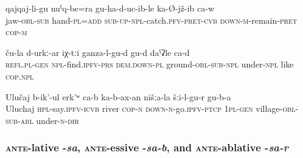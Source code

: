 \begin{exe}	
	\ex	\label{He is sitting with his hands holding his head}
	\gll	qajqaj-li-gu	nuˁq-be=ra	gu-ha-d-uc-ib-le	ka-Ø-jž-ib ca-w\\
		jaw-\textsc{obl}-\textsc{sub}	hand-\textsc{pl}=\textsc{add}	\textsc{sub-up-npl}-catch.\textsc{pfv}-\textsc{pret}-\textsc{cvb}	\textsc{down-m}-remain-\textsc{pret} \textsc{cop-m}\\
	\glt	{}
	
	\ex	\label{Their, these (vegetables) are probably (growing) under the ground}
	\gll	ču-la	d-urkː-ar	iχ-tːi	ganza-l-gu-d	gu-d	daˁʡle	ca-d\\
		\textsc{refl}.\textsc{pl}-\textsc{gen}	\textsc{npl}-find.\textsc{ipfv}-\textsc{prs}	\textsc{dem.down-pl}	ground-\textsc{obl}-\textsc{sub}-\textsc{npl}	under-\textsc{npl}	like	\textsc{cop.npl}\\
	\glt	{}

	
	\ex	\label{The river with the name Uluchaj is passing by down from our village}
	\gll	Ulučaj	b-ik'-ul	erk'ʷ	ca-b	ka-b-ax-an	nišːa-la	šːi-l-gu-r	gu-b-a\\
		Uluchaj	\textsc{hpl}-say.\textsc{ipfv}-\textsc{icvb}	river	\textsc{cop-n}	\textsc{down-n}-go.\textsc{ipfv}-\textsc{ptcp}	1\textsc{pl}-\textsc{gen}	village-\textsc{obl}-\textsc{sub}-\textsc{abl}	under-\textsc{n}-\textsc{dir}\\
	\glt	{}
\end{exe}


\subsubsection{\textsc{ante}-lative -\textit{sa}, \textsc{ante}-essive -\textit{sa-b}, and \textsc{ante}-ablative -\textit{sa-r}}
\label{sssec:ante-lative -sa, ante-essive -sa-b, and ante-\isi{ablative} -sa-r}

